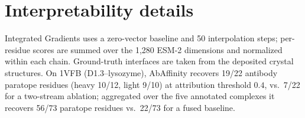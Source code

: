 \documentclass{article}
\begin{document}
\section{Interpretability details}
Integrated Gradients uses a zero-vector baseline and 50 interpolation steps; per-residue scores are summed
over the 1{,}280 ESM-2 dimensions and normalized within each chain. Ground-truth interfaces are taken from
the deposited crystal structures. On 1VFB (D1.3--lysozyme), AbAffinity recovers 19/22 antibody paratope
residues (heavy 10/12, light 9/10) at attribution threshold $0.4$, vs.\ 7/22 for a two-stream ablation;
aggregated over the five annotated complexes it recovers 56/73 paratope residues vs.\ 22/73 for a fused
baseline.
\end{document}
